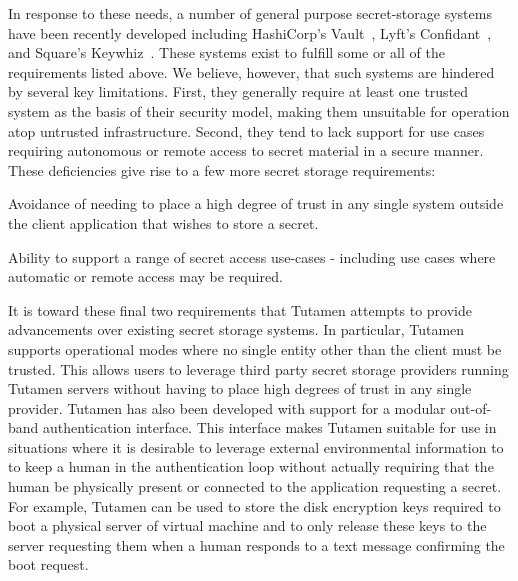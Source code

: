 In response to these needs, a number of general purpose secret-storage
systems have been recently developed including HashiCorp's
Vault~\cite{vault}, Lyft's Confidant~\cite{confidant}, and Square's
Keywhiz~\cite{keywhiz}. These systems exist to fulfill some or all of
the requirements listed above. We believe, however, that such systems
are hindered by several key limitations. First, they generally require
at least one trusted system as the basis of their security model,
making them unsuitable for operation atop untrusted
infrastructure. Second, they tend to lack support for use cases
requiring autonomous or remote access to secret material in a secure
manner. These deficiencies give rise to a few more secret
storage requirements:

\begin{packed_item}
\item Avoidance of needing to place a high degree of trust in any
  single system outside the client application that wishes to store a
  secret.
\item Ability to support a range of secret access use-cases -
  including use cases where automatic or remote access may be required.
\end{packed_item}

It is toward these final two requirements that Tutamen attempts to
provide advancements over existing secret storage systems. In
particular, Tutamen supports operational modes where no single entity
other than the client must be trusted. This allows users to leverage
third party secret storage providers running Tutamen servers without
having to place high degrees of trust in any single provider. Tutamen
has also been developed with support for a modular out-of-band
authentication interface. This interface makes Tutamen suitable for
use in situations where it is desirable to leverage external
environmental information to to keep a human in the authentication
loop without actually requiring that the human be physically present
or connected to the application requesting a secret. For example,
Tutamen can be used to store the disk encryption keys required to boot
a physical server of virtual machine and to only release these keys to
the server requesting them when a human responds to a text message
confirming the boot request.


